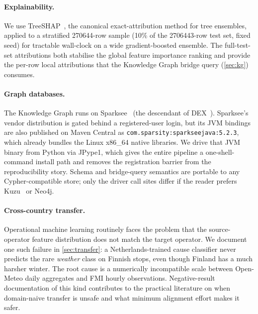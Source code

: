 \paragraph{Explainability.} We use TreeSHAP~\cite{lundberg2017unified,lundberg2020local}, the canonical exact-attribution method for tree ensembles, applied to a stratified \num{270644}-row sample (10\% of the \num{2706443}-row test set, fixed seed) for tractable wall-clock on a wide gradient-boosted ensemble. The full-test-set attributions both stabilise the global feature importance ranking and provide the per-row local attributions that the Knowledge Graph bridge query (\cref{sec:kg}) consumes.

\paragraph{Graph databases.} The Knowledge Graph runs on Sparksee~\cite{sparksee2024} (the descendant of DEX~\cite{martinez2017dex}). Sparksee's vendor distribution is gated behind a registered-user login, but its JVM bindings are also published on Maven Central as \texttt{com.sparsity:sparkseejava:5.2.3}, which already bundles the Linux x86\_64 native libraries. We drive that JVM binary from Python via JPype1, which gives the entire pipeline a one-shell-command install path and removes the registration barrier from the reproducibility story. Schema and bridge-query semantics are portable to any Cypher-compatible store; only the driver call sites differ if the reader prefers Kuzu~\cite{feng2023kuzu} or Neo4j.

\paragraph{Cross-country transfer.} Operational machine learning routinely faces the problem that the source-operator feature distribution does not match the target operator. We document one such failure in \cref{sec:transfer}: a Netherlands-trained cause classifier never predicts the rare \emph{weather} class on Finnish stops, even though Finland has a much harsher winter. The root cause is a numerically incompatible scale between Open-Meteo daily aggregates and FMI hourly observations. Negative-result documentation of this kind contributes to the practical literature on when domain-naive transfer is unsafe and what minimum alignment effort makes it safer.
